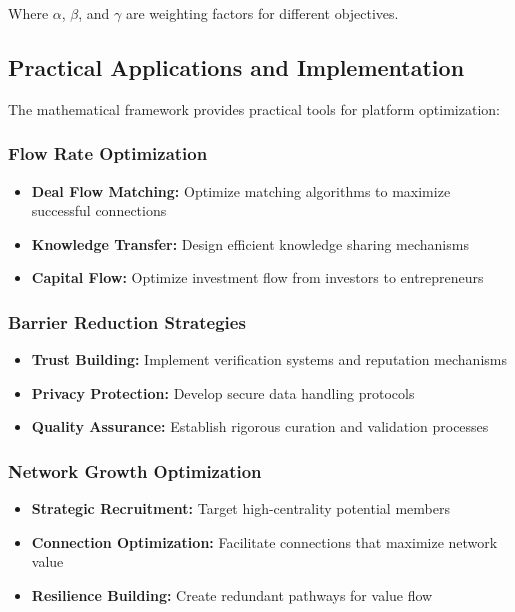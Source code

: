 Where $\alpha$, $\beta$, and $\gamma$ are weighting factors for different objectives.

\subsection{Practical Applications and Implementation}

The mathematical framework provides practical tools for platform optimization:

\subsubsection{Flow Rate Optimization}
\begin{itemize}
    \item \textbf{Deal Flow Matching:} Optimize matching algorithms to maximize successful connections
    \item \textbf{Knowledge Transfer:} Design efficient knowledge sharing mechanisms
    \item \textbf{Capital Flow:} Optimize investment flow from investors to entrepreneurs
\end{itemize}

\subsubsection{Barrier Reduction Strategies}
\begin{itemize}
    \item \textbf{Trust Building:} Implement verification systems and reputation mechanisms
    \item \textbf{Privacy Protection:} Develop secure data handling protocols
    \item \textbf{Quality Assurance:} Establish rigorous curation and validation processes
\end{itemize}

\subsubsection{Network Growth Optimization}
\begin{itemize}
    \item \textbf{Strategic Recruitment:} Target high-centrality potential members
    \item \textbf{Connection Optimization:} Facilitate connections that maximize network value
    \item \textbf{Resilience Building:} Create redundant pathways for value flow
\end{itemize}

